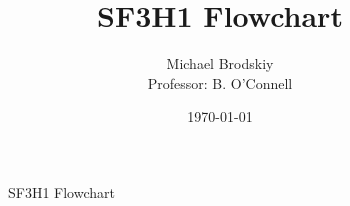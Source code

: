


\title{SF3H1 Flowchart}
\date{\today}
\author{Michael Brodskiy\\ \small Professor: B. O'Connell}



\maketitle

\begin{figure}[H]
  \centering
  
  \caption{SF3H1 Flowchart}
  \label{fig:1}
\end{figure}



